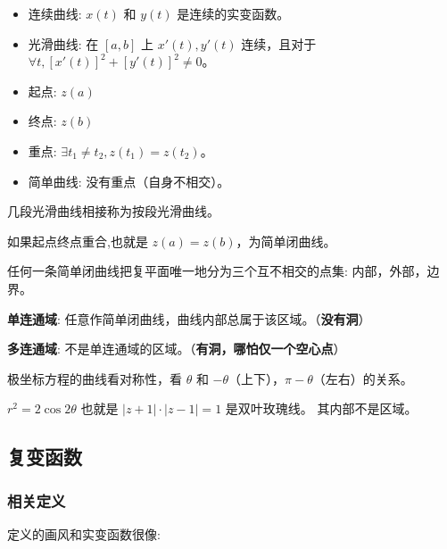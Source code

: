 \begin{itemize}
\item 连续曲线: \(x(t)\) 和 \(y(t)\) 是连续的实变函数。
\item 光滑曲线: 在 \([a,b]\) 上 \(x'(t),y'(t)\) 连续，且对于
\(\forall t, [x'(t)]^2 + [y'(t)]^2 \ne 0\)。
\item 起点: \(z(a)\)
\item 终点: \(z(b)\)
\item 重点: \(\exists t_1 \ne t_2, z(t_1)=z(t_2)\)。
\item 简单曲线: 没有重点（自身不相交）。
\end{itemize}

\begin{tcolorbox}[title={Note},colback=red!5!white
,colframe=red!75!black
,colbacktitle=yellow!50!red
,coltitle=red!25!black, fonttitle=\bfseries,subtitle style={boxrule=0.4pt, colback=yellow!50!red!25!white}]
几段光滑曲线相接称为按段光滑曲线。

如果起点终点重合,也就是 \(z(a)=z(b)\)，为简单闭曲线。

\end{tcolorbox}

任何一条简单闭曲线把复平面唯一地分为三个互不相交的点集: 内部，外部，边界。

\textbf{单连通域}: 任意作简单闭曲线，曲线内部总属于该区域。（\textbf{没有洞}）

\textbf{多连通域}: 不是单连通域的区域。（\textbf{有洞，哪怕仅一个空心点}）

\begin{tcolorbox}[title={Tip},colback=red!5!white
,colframe=red!75!black
,colbacktitle=yellow!50!red
,coltitle=red!25!black, fonttitle=\bfseries,subtitle style={boxrule=0.4pt, colback=yellow!50!red!25!white}]
极坐标方程的曲线看对称性，看 \(\theta\) 和
\(-\theta\)（上下），\(\pi - \theta\)（左右）的关系。

\(r^2 = 2\cos 2\theta\) 也就是 \(|z+1|\cdot |z-1| = 1\) 是双叶玫瑰线。
其内部不是区域。

\end{tcolorbox}
\subsection{复变函数}
\label{复变函数}
\subsubsection{相关定义}
\label{相关定义-1}
定义的画风和实变函数很像:

